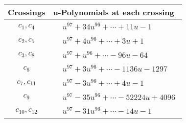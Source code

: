 \documentclass[1p]{elsarticle_modified}
\theoremstyle{definition}
\begin{document}
\begin{tabular}{m{50pt}|m{274pt}}
Crossings & \hspace{64pt}u-Polynomials at each crossing \\
\hline $$\begin{aligned}c_{1},c_{4}\end{aligned}$$&$\begin{aligned}
&u^{97}+34 u^{96}+\cdots+11 u-1
\end{aligned}$\\
\hline $$\begin{aligned}c_{2},c_{5}\end{aligned}$$&$\begin{aligned}
&u^{97}+4 u^{96}+\cdots+3 u+1
\end{aligned}$\\
\hline $$\begin{aligned}c_{3},c_{8}\end{aligned}$$&$\begin{aligned}
&u^{97}+u^{96}+\cdots-96 u-64
\end{aligned}$\\
\hline $$\begin{aligned}c_{6}\end{aligned}$$&$\begin{aligned}
&u^{97}+3 u^{96}+\cdots-1136 u-1297
\end{aligned}$\\
\hline $$\begin{aligned}c_{7},c_{11}\end{aligned}$$&$\begin{aligned}
&u^{97}-3 u^{96}+\cdots+4 u-1
\end{aligned}$\\
\hline $$\begin{aligned}c_{9}\end{aligned}$$&$\begin{aligned}
&u^{97}-35 u^{96}+\cdots-52224 u+4096
\end{aligned}$\\
\hline $$\begin{aligned}c_{10},c_{12}\end{aligned}$$&$\begin{aligned}
&u^{97}-31 u^{96}+\cdots-14 u-1
\end{aligned}$\\
\hline
\end{tabular}\\~\\
\newpage\renewcommand{\arraystretch}{1}
\end{document}
